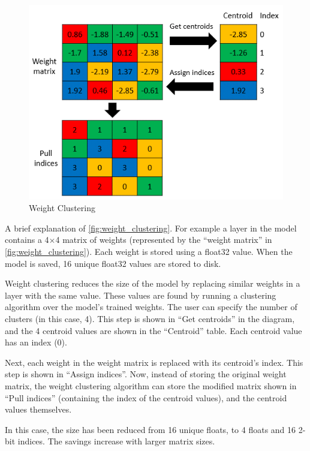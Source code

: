 \begin{figure}[ht]
    \includegraphics[width=\textwidth]{images/introduction/weight_clustering.png}
    \centering
    \caption{Weight Clustering}\label{fig:weight_clustering}
\end{figure}

A brief explanation of \autoref{fig:weight_clustering}. For example a layer in
the model contains a 4$\times$4 matrix of weights (represented by the
``weight matrix'' in \autoref{fig:weight_clustering}). Each weight is stored
using a float32 value. When the model is saved, 16 unique float32 values are
stored to disk.

Weight clustering reduces the size of the model by replacing similar weights in
a layer with the same value. These values are found by running a clustering
algorithm over the model’s trained weights. The user can specify the number of
clusters (in this case, 4). This step is shown in ``Get centroids'' in the
diagram, and the 4 centroid values are shown in the ``Centroid'' table. Each
centroid value has an index (0).

Next, each weight in the weight matrix is replaced with its centroid’s index.
This step is shown in ``Assign indices''. Now, instead of storing the original
weight matrix, the weight clustering algorithm can store the modified matrix
shown in ``Pull indices'' (containing the index of the centroid values), and
the centroid values themselves.

In this case, the size has been reduced from 16 unique floats, to 4 floats and
16 2-bit indices. The savings increase with larger matrix sizes.

